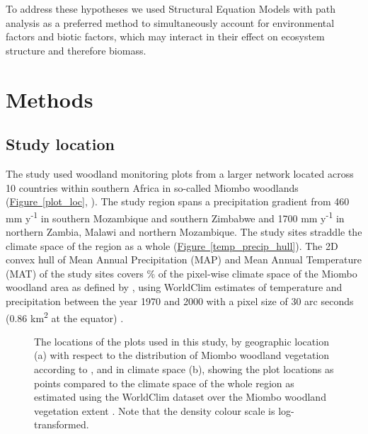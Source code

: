\documentclass[11pt,a4paper]{article}
\begin{document}
To address these hypotheses we used Structural Equation Models with path analysis as a preferred method to simultaneously account for environmental factors and biotic factors, which may interact in their effect on ecosystem structure and therefore biomass.

\section{Methods}

\subsection{Study location}

The study used \nplots{} woodland monitoring plots from a larger network located across 10 countries within southern Africa in so-called Miombo woodlands (\hyperref[plot_loc]{Figure~\ref*{plot_loc}}, \citealt{White1987}). The study region spans a precipitation gradient from \textapprox{}460 mm y\textsuperscript{-1} in southern Mozambique and southern Zimbabwe and \textapprox{}1700 mm y\textsuperscript{-1} in northern Zambia, Malawi and northern Mozambique. The study sites straddle the climate space of the region as a whole (\hyperref[temp_precip_hull]{Figure~\ref*{temp_precip_hull}}). The 2D convex hull of Mean Annual Precipitation (MAP) and Mean Annual Temperature (MAT) of the study sites covers \hullcover{}\% of the pixel-wise climate space of the Miombo woodland area as defined by \citet{White1987}, using WorldClim estimates of temperature and precipitation between the year 1970 and 2000 with a pixel size of 30 arc seconds (0.86 km\textsuperscript{2} at the equator) \citep{Fick2017}. 

\begin{figure}[H]
	\centering
    \qquad
{}%
\caption{The locations of the \nplots{} plots used in this study, by geographic location (a) with respect to the distribution of Miombo woodland vegetation according to \citet{White1987}, and in climate space (b), showing the plot locations as points compared to the climate space of the whole region as estimated using the WorldClim dataset over the Miombo woodland vegetation extent \citep{Fick2017}. Note that the density colour scale is log-transformed.}
\end{figure}
\end{document}
